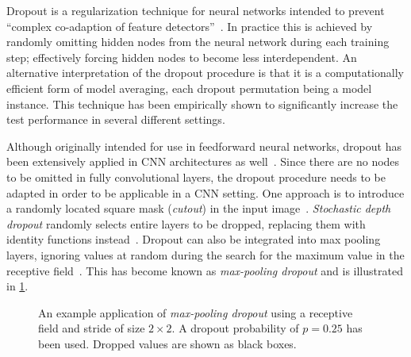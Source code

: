 Dropout is a regularization technique for neural networks intended to prevent \enquote{complex co-adaption of feature detectors}~\cite{dropout-original-paper}.
In practice this is achieved by randomly omitting hidden nodes from the neural network during each training step; effectively forcing hidden nodes to become less interdependent.
An alternative interpretation of the dropout procedure is that it is a computationally efficient form of model averaging, each dropout permutation being a model instance.
This technique has been empirically shown to significantly increase the test performance in several different settings.

Although originally intended for use in feedforward neural networks, dropout has been extensively applied in CNN architectures as well~\cite{dropout-cnn}.
Since there are no nodes to be omitted in fully convolutional layers, the dropout procedure needs to be adapted in order to be applicable in a CNN setting.
One approach is to introduce a randomly located square mask (\textit{cutout}) in the input image~\cite{dropout-cutout}.
\textit{Stochastic depth dropout} randomly selects entire layers to be dropped, replacing them with identity functions instead~\cite{dropout-stochastic-depth}.
Dropout can also be integrated into max pooling layers, ignoring values at random during the search for the maximum value in the receptive field~\cite{max-pooling-dropout}.
This has become known as \textit{max-pooling dropout} and is illustrated in \cref{fig:max-pooling-dropout}.

\begin{figure}[H]
  
  \caption{%
    An example application of \textit{max-pooling dropout} using a receptive field and stride of size $2 \times 2$.
    A dropout probability of $p = 0.25$ has been used.
    Dropped values are shown as black boxes.
  }%
  \label{fig:max-pooling-dropout}
\end{figure}
\raggedbottom
